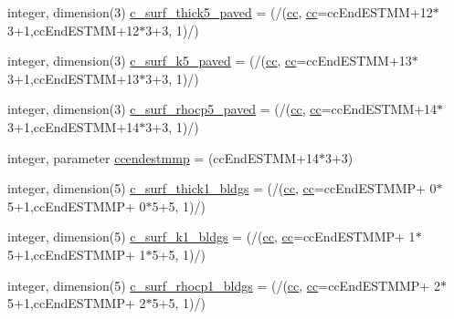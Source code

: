 \begin{DoxyCompactItemize}
\item 
integer, dimension(3) \hyperlink{namespaceallocatearray_ad328a4dec64b7d341695bbd0dec3d28f}{c\+\_\+surf\+\_\+thick5\+\_\+paved} = (/(\hyperlink{namespaceallocatearray_ac863c81704eb507dee10f5e10741e10c}{cc}, \hyperlink{namespaceallocatearray_ac863c81704eb507dee10f5e10741e10c}{cc}=cc\+End\+E\+S\+T\+MM+12$\ast$3+1,cc\+End\+E\+S\+T\+MM+12$\ast$3+3, 1)/)
\item 
integer, dimension(3) \hyperlink{namespaceallocatearray_a55ea661a6311737a605a66ff4d0686bb}{c\+\_\+surf\+\_\+k5\+\_\+paved} = (/(\hyperlink{namespaceallocatearray_ac863c81704eb507dee10f5e10741e10c}{cc}, \hyperlink{namespaceallocatearray_ac863c81704eb507dee10f5e10741e10c}{cc}=cc\+End\+E\+S\+T\+MM+13$\ast$3+1,cc\+End\+E\+S\+T\+MM+13$\ast$3+3, 1)/)
\item 
integer, dimension(3) \hyperlink{namespaceallocatearray_abfdcde71bd1c263d5cf829353a897407}{c\+\_\+surf\+\_\+rhocp5\+\_\+paved} = (/(\hyperlink{namespaceallocatearray_ac863c81704eb507dee10f5e10741e10c}{cc}, \hyperlink{namespaceallocatearray_ac863c81704eb507dee10f5e10741e10c}{cc}=cc\+End\+E\+S\+T\+MM+14$\ast$3+1,cc\+End\+E\+S\+T\+MM+14$\ast$3+3, 1)/)
\item 
integer, parameter \hyperlink{namespaceallocatearray_aea45a9a70b07fc8b92b8946a2b41e299}{ccendestmmp} = (cc\+End\+E\+S\+T\+MM+14$\ast$3+3)
\item 
integer, dimension(5) \hyperlink{namespaceallocatearray_ac6eb5a733ab48407dd1b0cd5d0bf4780}{c\+\_\+surf\+\_\+thick1\+\_\+bldgs} = (/(\hyperlink{namespaceallocatearray_ac863c81704eb507dee10f5e10741e10c}{cc}, \hyperlink{namespaceallocatearray_ac863c81704eb507dee10f5e10741e10c}{cc}=cc\+End\+E\+S\+T\+M\+MP+ 0$\ast$5+1,cc\+End\+E\+S\+T\+M\+MP+ 0$\ast$5+5, 1)/)
\item 
integer, dimension(5) \hyperlink{namespaceallocatearray_a24292d640a153248dd27a9d46e279457}{c\+\_\+surf\+\_\+k1\+\_\+bldgs} = (/(\hyperlink{namespaceallocatearray_ac863c81704eb507dee10f5e10741e10c}{cc}, \hyperlink{namespaceallocatearray_ac863c81704eb507dee10f5e10741e10c}{cc}=cc\+End\+E\+S\+T\+M\+MP+ 1$\ast$5+1,cc\+End\+E\+S\+T\+M\+MP+ 1$\ast$5+5, 1)/)
\item 
integer, dimension(5) \hyperlink{namespaceallocatearray_a54737eb445f1177103369c151c2c7116}{c\+\_\+surf\+\_\+rhocp1\+\_\+bldgs} = (/(\hyperlink{namespaceallocatearray_ac863c81704eb507dee10f5e10741e10c}{cc}, \hyperlink{namespaceallocatearray_ac863c81704eb507dee10f5e10741e10c}{cc}=cc\+End\+E\+S\+T\+M\+MP+ 2$\ast$5+1,cc\+End\+E\+S\+T\+M\+MP+ 2$\ast$5+5, 1)/)
\item 

\end{DoxyCompactItemize}
